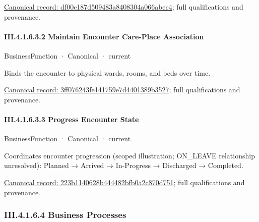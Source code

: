 {\footnotesize \href{../../../../../../../continuum/business/business-function/df00c187d509483a8408304a066abec4.md}{Canonical record: df00c187d509483a8408304a066abec4}; full qualifications and provenance.}\par
\paragraph*{III.4.1.6.3.2 Maintain Encounter Care-Place Association}
\label{navigation:III.4.1.6.3.2}

\label{element:3ff076243fe141759e7d4401389b3527}
{\small BusinessFunction · Canonical · current}\par

Binds the encounter to physical wards, rooms, and beds over time.


{\footnotesize \href{../../../../../../../continuum/business/business-function/3ff076243fe141759e7d4401389b3527.md}{Canonical record: 3ff076243fe141759e7d4401389b3527}; full qualifications and provenance.}\par
\paragraph*{III.4.1.6.3.3 Progress Encounter State}
\label{navigation:III.4.1.6.3.3}

\label{element:223b1140628b444482bfb0a2c870d751}
{\small BusinessFunction · Canonical · current}\par

Coordinates encounter progression (scoped illustration; ON\_LEAVE relationship unresolved): Planned → Arrived → In-Progress → Discharged → Completed.


{\footnotesize \href{../../../../../../../continuum/business/business-function/223b1140628b444482bfb0a2c870d751.md}{Canonical record: 223b1140628b444482bfb0a2c870d751}; full qualifications and provenance.}\par
\subsubsection*{III.4.1.6.4 Business Processes}
\label{navigation:III.4.1.6.4}


